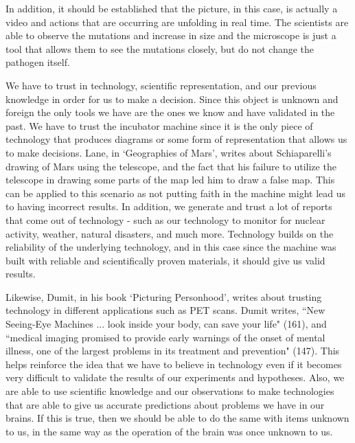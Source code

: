 \documentclass[11pt, oneside]{article}
\begin{document}
\par In addition, it should be established that the picture, in this case, is actually a video and actions that are occurring are unfolding in real time. The scientists are able to observe the mutations and increase in size and the microscope is just a tool that allows them to see the mutations closely, but do not change the pathogen itself.

\par We have to trust in technology, scientific representation, and our previous knowledge in order for us to make a decision. Since this object is unknown and foreign the only tools we have are the ones we know and have validated in the past. We have to trust the incubator machine since it is the only piece of technology that produces diagrams or some form of representation that allows us to make decisions. Lane, in `Geographies of Mars', writes about Schiaparelli's drawing of Mars using the telescope, and the fact that his failure to utilize the telescope in drawing some parts of the map led him to draw a false map. This can be applied to this scenario as not putting faith in the machine might lead us to having incorrect results. In addition, we generate and trust a lot of reports that come out of technology - such as our technology to monitor for nuclear activity, weather, natural disasters, and much more. Technology builds on the reliability of the underlying technology, and in this case since the machine was built with reliable and scientifically proven materials, it should give us valid results. 

\par Likewise, Dumit, in his book `Picturing Personhood', writes about trusting technology in different applications such as PET scans. Dumit writes, ``New Seeing-Eye Machines ... look inside your body, can save your life" (161), and ``medical imaging promised to provide early warnings of the onset of mental illness, one of the largest problems in its treatment and prevention" (147). This helps reinforce the idea that we have to believe in technology even if it becomes very difficult to validate the results of our experiments and hypotheses. Also, we are able to use scientific knowledge and our observations to make technologies that are able to give us accurate predictions about problems we have in our brains. If this is true, then we should be able to do the same with items unknown to us, in the same way as the operation of the brain was once unknown to us.
\end{document}
